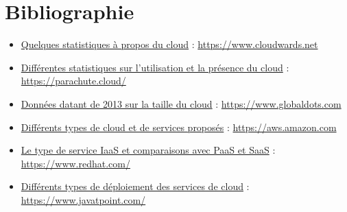 \documentclass[a4paper, 12pt]{article}
\begin{document}
  \section{Bibliographie}
    \begin{itemize}
      \item \href{https://www.cloudwards.net/cloud-computing-statistics/}{Quelques statistiques à propos du cloud} : \url{https://www.cloudwards.net}
      \item \href{https://parachute.cloud/cloud-computing-statistics/}{Différentes statistiques sur l'utilisation et la présence du cloud} : \url{https://parachute.cloud/}
      \item \href{https://www.globaldots.com/resources/blog/how-much-is-stored-in-the-cloud/}{Données datant de 2013 sur la taille du cloud} : \url{https://www.globaldots.com}
      \item \href{https://aws.amazon.com/fr/types-of-cloud-computing/}{Différents types de cloud et de services proposés} : \url{https://aws.amazon.com}
      \item \href{https://www.redhat.com/fr/topics/cloud-computing/what-is-iaas}{Le type de service IaaS et comparaisons avec PaaS et SaaS} : \url{https://www.redhat.com/}
      \item \href{https://www.javatpoint.com/cloud-deployment-model}{Différents types de déploiement des services de cloud} : \url{https://www.javatpoint.com/}
    \end{itemize}
\end{document}
